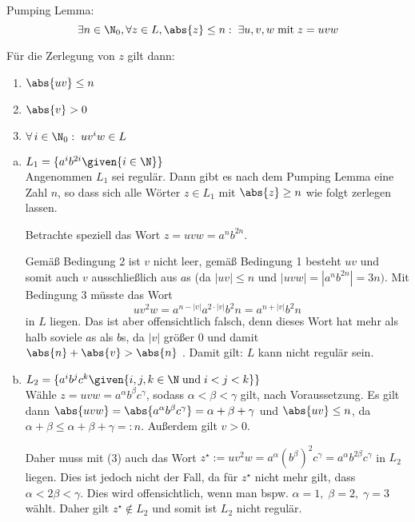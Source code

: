 Pumping Lemma:
\[ \exists n \in \N_0, \forall z \in L, \abs{z} \leq n: \;
 \exists u,v,w \; \text{mit} \; z = uvw \]

Für die Zerlegung von $z$ gilt dann:
\begin{enumerate}
\item $\abs{uv} \leq n$
\item $ \abs{v} > 0$
\item $\forall \, i \in \N_0: \; uv^i w \in L$
\end{enumerate}

\vspace{2em}
  \begin{enumerate}[a)]
  \item $ L_1 = \{ a^i b^{2i} \given{i \in \N} \} $ \\

    Angenommen $L_1$ sei regulär. Dann gibt es nach dem Pumping Lemma eine Zahl $n$, so dass sich alle Wörter $ z \in L_1 $ mit $ \abs{z} \geq n $ wie folgt zerlegen lassen.

    Betrachte speziell das Wort $z = uvw = a^n b^{2n}$.

    Gemäß Bedingung 2 ist $v$ nicht leer, gemäß Bedingung 1 besteht $uv$ und somit auch $v$ ausschließlich aus $a$s (da $\left|uv\right| \leq n$ und $\left|uvw\right| = \left|a^n b^{2n}\right| = 3n)$. Mit Bedingung 3 müsste das Wort
    \[ uv^2w = a^{n - \left|v\right|} a^{2 \cdot \left|v\right|}b^2n = a^{n+ \left|v\right|}b^2n \]
    in $L$ liegen. Das ist aber offensichtlich falsch, denn dieses Wort hat mehr als halb soviele $a$s als $b$s, da  ${\left|v\right|}$ größer 0 und damit $\abs{n} + \abs{v} > \abs{n}$ . Damit gilt: $L$ kann nicht regulär sein. \\

  \item $ L_2 = \{  a^{i} b^{j} c^{k} \given {i,j,k \in \N \; \text{und} \; i < j < k}  \} $ \\

    Wähle $z = uvw = a^{\alpha} b^{\beta} c^{\gamma}$, sodass $\alpha < \beta < \gamma$ gilt, nach Voraussetzung. Es gilt dann $\abs{uvw} = \abs{ a^{\alpha} b^{\beta} c^{\gamma} } = \alpha + \beta + \gamma $ und $\abs{uv} \leq n$, da $\alpha + \beta \leq \alpha + \beta + \gamma =: n$. Außerdem gilt $v > 0$.

    Daher muss mit (3) auch das Wort $z^{\star} := uv^2 w = a^{\alpha} (b^{\beta})^2 c^{\gamma} = a^{\alpha} b^{2 \beta} c^{\gamma}$ in $L_2$ liegen. Dies ist jedoch nicht der Fall, da für $z^{\star}$ nicht mehr gilt, dass $\alpha < 2 \beta < \gamma$. Dies wird offensichtlich, wenn man bspw. $\alpha = 1, \; \beta = 2, \; \gamma = 3$ wählt. Daher gilt $z^{\star} \notin L_2$ und somit ist $L_2$ nicht regulär.\\


\end{enumerate}
